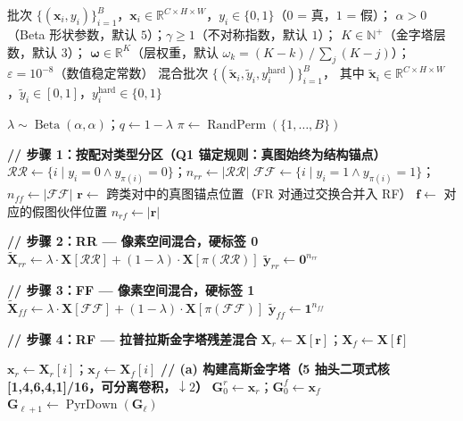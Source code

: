 \documentclass[12pt]{article}
\begin{document}
\clearpage
\begin{algorithm}[p]
\caption{LapPyramidMixup（拉普拉斯金字塔残差混合，配合 v1 采样器）}
\label{alg:lap}
\begin{algorithmic}[1]\scriptsize
\Require
  批次 $\{(\mathbf{x}_i, y_i)\}_{i=1}^{B}$，$\mathbf{x}_i \in \mathbb{R}^{C \times H \times W}$，$y_i \in \{0,1\}$（$0$ = 真，$1$ = 假）；
  $\alpha > 0$（Beta 形状参数，默认 $5$）；$\gamma \ge 1$（不对称指数，默认 $1$）；
  $K \in \mathbb{N}^+$（金字塔层数，默认 $3$）；
  $\bm{\omega} \in \mathbb{R}^{K}$（层权重，默认 $\omega_k = (K - k)\,/\,\sum_j (K - j)$）；
  $\varepsilon = 10^{-8}$（数值稳定常数）
\Ensure
  混合批次 $\{(\tilde{\mathbf{x}}_i, \tilde{y}_i, y^{\text{hard}}_i)\}_{i=1}^{B}$，
  其中 $\tilde{\mathbf{x}}_i \in \mathbb{R}^{C \times H \times W}$，$\tilde{y}_i \in [0,1]$，$y^{\text{hard}}_i \in \{0,1\}$

\State $\lambda \sim \operatorname{Beta}(\alpha, \alpha)$；\quad $q \gets 1 - \lambda$ 
\State $\pi \gets \operatorname{RandPerm}(\{1,\dots,B\})$

\State \textbf{// 步骤 1：按配对类型分区（Q1 锚定规则：真图始终为结构锚点）}
\State $\mathcal{RR} \gets \{i \mid y_i = 0 \land y_{\pi(i)} = 0\}$；\quad $n_{rr} \gets |\mathcal{RR}|$
\State $\mathcal{FF} \gets \{i \mid y_i = 1 \land y_{\pi(i)} = 1\}$；\quad $n_{ff} \gets |\mathcal{FF}|$
\State $\mathbf{r} \gets$ 跨类对中的真图锚点位置（FR 对通过交换合并入 RF）
\State $\mathbf{f} \gets$ 对应的假图伙伴位置
\State $n_{rf} \gets |\mathbf{r}|$

\State \textbf{// 步骤 2：RR — 像素空间混合，硬标签 0}
\State $\tilde{\mathbf{X}}_{rr} \gets \lambda \cdot \mathbf{X}[\mathcal{RR}] + (1-\lambda) \cdot \mathbf{X}[\pi(\mathcal{RR})]$
\State $\tilde{\mathbf{y}}_{rr} \gets \mathbf{0}^{n_{rr}}$

\State \textbf{// 步骤 3：FF — 像素空间混合，硬标签 1}
\State $\tilde{\mathbf{X}}_{ff} \gets \lambda \cdot \mathbf{X}[\mathcal{FF}] + (1-\lambda) \cdot \mathbf{X}[\pi(\mathcal{FF})]$
\State $\tilde{\mathbf{y}}_{ff} \gets \mathbf{1}^{n_{ff}}$

\State \textbf{// 步骤 4：RF — 拉普拉斯金字塔残差混合}
  \State $\mathbf{X}_r \gets \mathbf{X}[\mathbf{r}]$；\quad $\mathbf{X}_f \gets \mathbf{X}[\mathbf{f}]$ 

   
    \State $\mathbf{x}_r \gets \mathbf{X}_r[i]$；\quad $\mathbf{x}_f \gets \mathbf{X}_f[i]$
    \State \textbf{// (a) 构建高斯金字塔（5 抽头二项式核 [1,4,6,4,1]/16，可分离卷积，$\downarrow\!2$）}
    \State $\mathbf{G}_0^r \gets \mathbf{x}_r$；\quad $\mathbf{G}_0^f \gets \mathbf{x}_f$
      \State $\mathbf{G}_{\ell+1} \gets \operatorname{PyrDown}(\mathbf{G}_\ell)$
    \EndFor


\end{algorithmic}
\end{algorithm}
\end{document}
